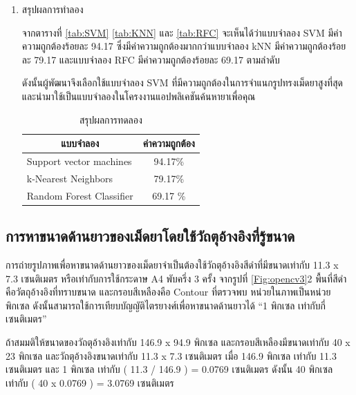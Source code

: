 \begin{enumerate}
			\item สรุปผลการทำลอง
			
			
			จากตารางที่ \ref{tab:SVM} \ref{tab:KNN} และ \ref{tab:RFC} 
			จะเห็นได้ว่าแบบจำลอง SVM มีค่าความถูกต้องร้อยละ 94.17 
			ซึ่งมีค่าความถูกต้องมากกว่าแบบจำลอง 
			kNN มีค่าความถูกต้องร้อยละ 79.17
			และแบบจำลอง RFC มีค่าความถูกต้องร้อยละ 69.17 ตามลำดับ 
			
			ดังนั้นผู้พัฒนาจึงเลือกใช้แบบจำลอง SVM 
			ที่มีความถูกต้องในการจำแนกรูปทรงเม็ดยาสูงที่สุด 
			และนำมาใช้เป็นแบบจำลองในโครงงานแอปพลิเคชันค้นหายาเพื่อคุณ

			\begin{table}[H]
				\centering
				\caption{สรุปผลการทดลอง}
				\label{tab:summary}
				\begin{tabular}{| p{5cm}|c|}
				\hline
				\multicolumn{1}{|c|}{\textbf{แบบจำลอง}} & ค่าความถูกต้อง \\ \hline				
				Support vector machines &  94.17\% \\ \hline
				k-Nearest Neighbors &  79.17\% \\ \hline
				Random Forest Classifier &  69.17 \% \\ \hline
				\end{tabular}
			\end{table}

		\end{enumerate}

	\subsection{การหาขนาดด้านยาวของเม็ดยาโดยใช้วัถตุอ้างอิงที่รู้ขนาด}
		การถ่ายรูปภาพเพื่อหาขนาดด้านยาวของเม็ดยาจำเป็นต้องใช้วัถตุอ้างอิงสีดำที่มีขนาดเท่ากับ 11.3 x 7.3 เซนติเมตร หรือเท่ากับการใช้กระดาษ A4 พับครึ่ง 3 ครั้ง จากรูปที่ \ref{Fig:opencv3}2 พื้นที่สีดำคือวัตถุอ้างอิงที่ทราบขนาด และกรอบสีเหลืองคือ Contour ที่ตรวจพบ หน่วยในภาพเป็นหน่วยพิกเซล ดังนั้นสามารถใช้การเทียบบัญญัติไตรยางศ์เพื่อหาขนาดด้านยาวได้ “1 พิกเซล เท่ากับกี่เซนติเมตร”
	
		ถ้าสมมติให้ขนาดของวัถตุอ้างอิงเท่ากับ 146.9 x 94.9 พิกเซล และกรอบสีเหลืองมีขนาดเท่ากับ 40 x 23 พิกเซล และวัถตุอ้างอิงขนาดเท่ากับ 11.3 x 7.3 เซนติเมตร เมื่อ 146.9 พิกเซล เท่ากับ 11.3 เซนติเมตร และ 1 พิกเซล เท่ากับ ( 11.3 / 146.9 ) = 0.0769 เซนติเมตร ดังนั้น 40 พิกเซล เท่ากับ ( 40 x 0.0769 )  = 3.0769 เซนติเมตร 
	
